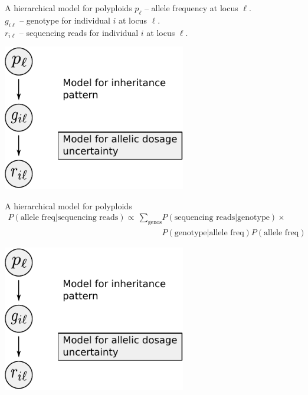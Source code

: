 \documentclass[presentation]{beamer}
\begin{document}
\begin{frame}[c]{A hierarchical model for polyploids}
	$p_{\ell}$ -- allele frequency at locus $\ell$. \\
	$g_{i \ell}$ -- genotype for individual $i$ at locus $\ell$. \\
	$r_{i \ell}$ -- sequencing reads for individual $i$ at locus $\ell$.
	\vspace{0.1in}
	\begin{center}
		\includegraphics[width=0.6\textwidth]{fig/figure1-model-graph}
	\end{center}
\end{frame}

\begin{frame}[t]{A hierarchical model for polyploids}
	\fontsize{10pt}{10}\selectfont
	\vspace{-0.21in}
	\begin{align*}
		P(\text{allele freq} \vert \text{sequencing reads}) \propto\, \sum_{\text{genos}} &P(\text{sequencing reads} \vert \text{genotype}) \times\\
		&P(\text{genotype} \vert \text{allele freq})P(\text{allele freq})
	\end{align*}
		
	\begin{center}
		\includegraphics[width=0.6\textwidth]{fig/figure1-model-graph}
	\end{center}
\end{frame}
\end{document}
